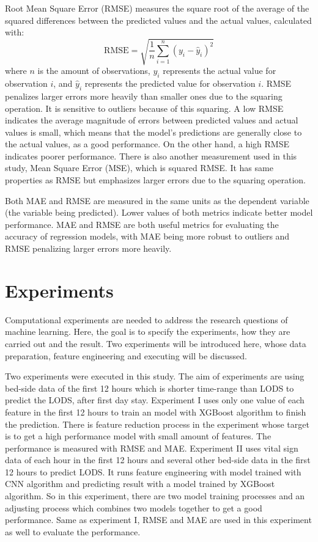 \documentclass[12pt,a4paper,english
]{tunithesis}
\begin{document}
Root Mean Square Error (RMSE) measures the square root of the average of the squared differences between the predicted values and the actual values, calculated with: 
\begin{equation}
    \mathrm{RMSE}=\sqrt{\frac{1}{n} \sum_{i=1}^n\left(y_i-\hat{y}_i\right)^2}
\end{equation}
where $n$ is the amount of observations, $y_i$ represents the actual value for observation $i$, and $\hat{y}_i$ represents the predicted value for observation $i$. RMSE penalizes larger errors more heavily than smaller ones due to the squaring operation. It is sensitive to outliers because of this squaring. A low RMSE indicates the average magnitude of errors between predicted values and actual values is small, which means that the model's predictions are generally close to the actual values, as a good performance. On the other hand, a high RMSE indicates poorer performance. There is also another measurement used in this study, Mean Square Error (MSE), which is squared RMSE. It has same properties as RMSE but emphasizes larger errors due to the squaring operation.

Both MAE and RMSE are measured in the same units as the dependent variable (the variable being predicted). Lower values of both metrics indicate better model performance. MAE and RMSE are both useful metrics for evaluating the accuracy of regression models, with MAE being more robust to outliers and RMSE penalizing larger errors more heavily.


\chapter{Experiments}
\label{ch:experiment}
Computational experiments are needed to address the research questions of machine learning. Here, the goal is to specify the experiments, how they are carried out and the result. Two experiments will be introduced here, whose data preparation, feature engineering and executing will be discussed.

Two experiments were executed in this study. The aim of experiments are using bed-side data of the first 12 hours which is shorter time-range than LODS to predict the LODS, after first day stay. Experiment I uses only one value of each feature in the first 12 hours to train an model with XGBoost algorithm to finish the prediction. There is feature reduction process in the experiment whose target is to get a high performance model with small amount of features. The performance is measured with RMSE and MAE.
Experiment II uses vital sign data of each hour in the first 12 hours and several other bed-side data in the first 12 hours to predict LODS. It runs feature engineering with model trained with CNN algorithm and predicting result with a model trained by XGBoost algorithm. So in this experiment, there are two model training processes and an adjusting process which combines two models together to get a good performance. Same as experiment I, RMSE and MAE are used in this experiment as well to evaluate the performance.
\end{document}
